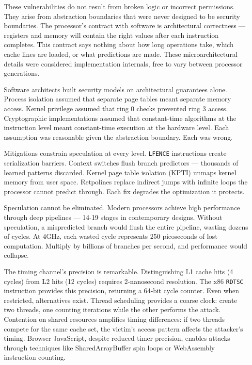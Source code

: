 These vulnerabilities do not result from broken logic or incorrect permissions. They arise from abstraction boundaries that were never designed to be security boundaries. The processor's contract with software is architectural correctness — registers and memory will contain the right values after each instruction completes. This contract says nothing about how long operations take, which cache lines are loaded, or what predictions are made. These microarchitectural details were considered implementation internals, free to vary between processor generations.

Software architects built security models on architectural guarantees alone. Process isolation assumed that separate page tables meant separate memory access. Kernel privilege assumed that ring 0 checks prevented ring 3 access. Cryptographic implementations assumed that constant-time algorithms at the instruction level meant constant-time execution at the hardware level. Each assumption was reasonable given the abstraction boundary. Each was wrong.

Mitigations constrain speculation at every level. \texttt{LFENCE} instructions create serialization barriers. Context switches flush branch predictors — thousands of learned patterns discarded. Kernel page table isolation (KPTI) unmaps kernel memory from user space. Retpolines replace indirect jumps with infinite loops the processor cannot predict through. Each fix degrades the optimization it protects.

Speculation cannot be eliminated. Modern processors achieve high performance through deep pipelines — 14-19 stages in contemporary designs. Without speculation, a mispredicted branch would flush the entire pipeline, wasting dozens of cycles. At 4GHz, each wasted cycle represents 250 picoseconds of lost computation. Multiply by billions of branches per second, and performance would collapse.

The timing channel's precision is remarkable. Distinguishing L1 cache hits (4 cycles) from L2 hits (12 cycles) requires 2-nanosecond resolution. The x86 \texttt{RDTSC} instruction provides this precision, returning a 64-bit cycle counter. Even when restricted, alternatives exist. Thread scheduling provides a coarse clock: create two threads, one counting iterations while the other performs the attack. Contention on shared resources amplifies timing differences: if two threads compete for the same cache set, the victim's access pattern affects the attacker's timing. Browser JavaScript, despite reduced timer precision, enables attacks through techniques like SharedArrayBuffer spin loops or WebAssembly instruction counting.

